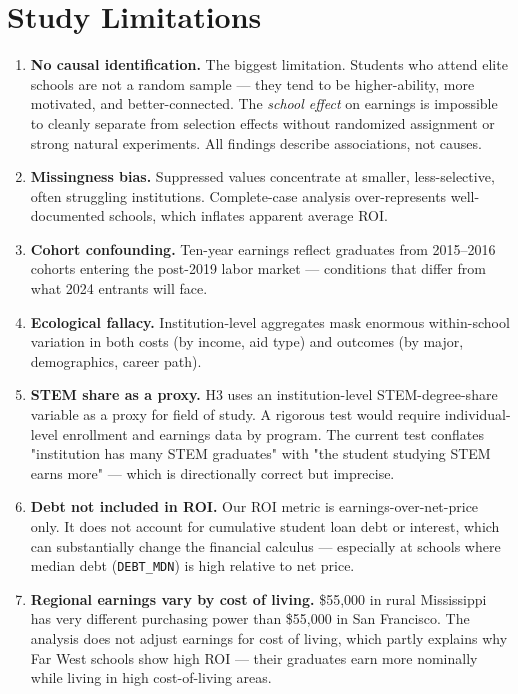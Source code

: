 \documentclass[12pt, letterpaper]{article}
\begin{document}
\section{Study Limitations}

\begin{enumerate}
  \item \textbf{No causal identification.} The biggest limitation. Students who attend elite schools are not a random sample — they tend to be higher-ability, more motivated, and better-connected. The \textit{school effect} on earnings is impossible to cleanly separate from selection effects without randomized assignment or strong natural experiments. All findings describe associations, not causes.

  \item \textbf{Missingness bias.} Suppressed values concentrate at smaller, less-selective, often struggling institutions. Complete-case analysis over-represents well-documented schools, which inflates apparent average ROI.

  \item \textbf{Cohort confounding.} Ten-year earnings reflect graduates from 2015–2016 cohorts entering the post-2019 labor market — conditions that differ from what 2024 entrants will face.

  \item \textbf{Ecological fallacy.} Institution-level aggregates mask enormous within-school variation in both costs (by income, aid type) and outcomes (by major, demographics, career path).

  \item \textbf{STEM share as a proxy.} H3 uses an institution-level STEM-degree-share variable as a proxy for field of study. A rigorous test would require individual-level enrollment and earnings data by program. The current test conflates "institution has many STEM graduates" with "the student studying STEM earns more" — which is directionally correct but imprecise.

  \item \textbf{Debt not included in ROI.} Our ROI metric is earnings-over-net-price only. It does not account for cumulative student loan debt or interest, which can substantially change the financial calculus — especially at schools where median debt (\texttt{DEBT\_MDN}) is high relative to net price.

  \item \textbf{Regional earnings vary by cost of living.} \$55,000 in rural Mississippi has very different purchasing power than \$55,000 in San Francisco. The analysis does not adjust earnings for cost of living, which partly explains why Far West schools show high ROI — their graduates earn more nominally while living in high cost-of-living areas.


\end{enumerate}
\end{document}

